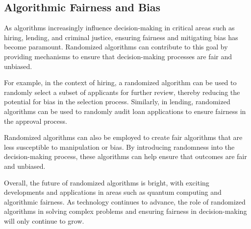 \documentclass[12pt]{book} %
\begin{document}
\subsection{Algorithmic Fairness and Bias}

As algorithms increasingly influence decision-making in critical areas such as hiring, lending, and criminal justice, ensuring fairness and mitigating bias has become paramount. Randomized algorithms can contribute to this goal by providing mechanisms to ensure that decision-making processes are fair and unbiased.

For example, in the context of hiring, a randomized algorithm can be used to randomly select a subset of applicants for further review, thereby reducing the potential for bias in the selection process. Similarly, in lending, randomized algorithms can be used to randomly audit loan applications to ensure fairness in the approval process.

Randomized algorithms can also be employed to create fair algorithms that are less susceptible to manipulation or bias. By introducing randomness into the decision-making process, these algorithms can help ensure that outcomes are fair and unbiased.

Overall, the future of randomized algorithms is bright, with exciting developments and applications in areas such as quantum computing and algorithmic fairness. As technology continues to advance, the role of randomized algorithms in solving complex problems and ensuring fairness in decision-making will only continue to grow.
\end{document}
